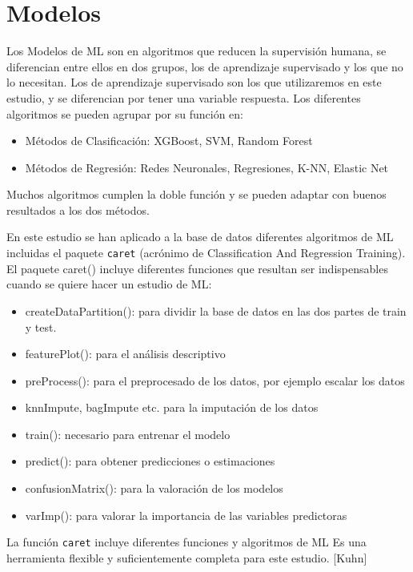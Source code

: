 \documentclass[
]{article}
\begin{document}
\pagebreak

\hypertarget{modelos}{%
\section{Modelos}\label{modelos}}

Los Modelos de ML son en algoritmos que reducen la supervisión humana,
se diferencian entre ellos en dos grupos, los de aprendizaje supervisado
y los que no lo necesitan. Los de aprendizaje supervisado son los que
utilizaremos en este estudio, y se diferencian por tener una variable
respuesta. Los diferentes algoritmos se pueden agrupar por su función
en:

\begin{itemize}
\item
  Métodos de Clasificación: XGBoost, SVM, Random Forest
\item
  Métodos de Regresión: Redes Neuronales, Regresiones, K-NN, Elastic Net
\end{itemize}

Muchos algoritmos cumplen la doble función y se pueden adaptar con
buenos resultados a los dos métodos.

En este estudio se han aplicado a la base de datos diferentes algoritmos
de ML incluidas el paquete \texttt{caret} (acrónimo de Classification
And Regression Training). El paquete caret() incluye diferentes
funciones que resultan ser indispensables cuando se quiere hacer un
estudio de ML:

\begin{itemize}
\item
  createDataPartition(): para dividir la base de datos en las dos partes
  de train y test.
\item
  featurePlot(): para el análisis descriptivo
\item
  preProcess(): para el preprocesado de los datos, por ejemplo escalar
  los datos
\item
  knnImpute, bagImpute etc. para la imputación de los datos
\item
  train(): necesario para entrenar el modelo
\item
  predict(): para obtener predicciones o estimaciones
\item
  confusionMatrix(): para la valoración de los modelos
\item
  varImp(): para valorar la importancia de las variables predictoras
\end{itemize}

La función \texttt{caret} incluye diferentes funciones y algoritmos de
ML Es una herramienta flexible y suficientemente completa para este
estudio. {[}Kuhn{]}
\end{document}
